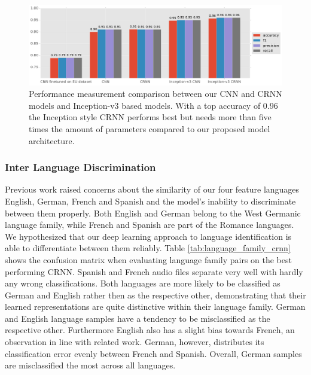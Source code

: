 	\begin{figure}[]
  		\centering
    	\includegraphics[width=\textwidth, keepaspectratio]{plots/results_news_plot.pdf}
    	\caption{Performance measurement comparison between our CNN and CRNN models and Inception-v3 based models. With a top accuracy of 0.96 the Inception style CRNN performs best but needs more than five times the amount of parameters compared to our proposed model architecture.}
    	\label{fig:news_results}
	\end{figure}
	


\subsubsection{Inter Language Discrimination} 
\label{sec:lang_discrimination}

Previous work\cite{montavon2009deep} raised concerns about the similarity of our four feature languages \textendash{} English, German, French and Spanish \textendash{} and the model's inability to discriminate between them properly. Both English and German belong to the West Germanic language family, while French and Spanish are part of the Romance languages. We hypothesized that our deep learning approach to language identification is able to differentiate between them reliably. 
Table \ref{tab:language_family_crnn} shows the confusion matrix when evaluating language family pairs on the best performing CRNN. Spanish and French audio files separate very well with hardly any wrong classifications. Both languages are more likely to be classified as German and English rather then as the respective other, demonstrating that their learned representations are quite distinctive within their language family. 
German and English language samples have a tendency to be misclassified as the respective other. Furthermore English also has a slight bias towards French, an observation in line with related work\cite{werkmeister2016practical}. German, however, distributes its classification error evenly between French and Spanish. Overall, German samples are misclassified the most across all languages.

